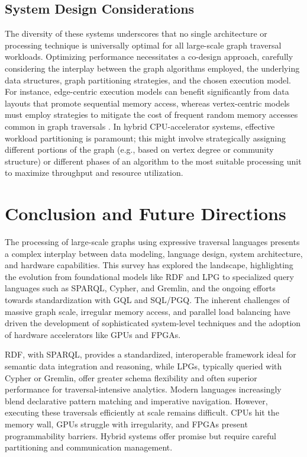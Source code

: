 \documentclass[sigconf,natbib=false]{acmart}
\begin{document}
\subsection*{System Design Considerations}

The diversity of these systems underscores that no single architecture or processing technique is universally optimal for all large-scale graph traversal workloads.
Optimizing performance necessitates a co-design approach, carefully considering the interplay between the graph algorithms employed, the underlying data structures, graph partitioning strategies, and the chosen execution model.
For instance, edge-centric execution models can benefit significantly from data layouts that promote sequential memory access, whereas vertex-centric models must employ strategies to mitigate the cost of frequent random memory accesses common in graph traversals \cite{liu2020LargescaleGraphProcessing}.
In hybrid CPU-accelerator systems, effective workload partitioning is paramount; this might involve strategically assigning different portions of the graph (e.g., based on vertex degree or community structure) or different phases of an algorithm to the most suitable processing unit to maximize throughput and resource utilization.

\section{Conclusion and Future Directions}
The processing of large-scale graphs using expressive traversal languages presents a complex interplay between data modeling, language design, system architecture, and hardware capabilities.
This survey has explored the landscape, highlighting the evolution from foundational models like RDF and LPG to specialized query languages such as SPARQL, Cypher, and Gremlin, and the ongoing efforts towards standardization with GQL and SQL/PGQ.
The inherent challenges of massive graph scale, irregular memory access, and parallel load balancing have driven the development of sophisticated system-level techniques and the adoption of hardware accelerators like GPUs and FPGAs.

RDF, with SPARQL, provides a standardized, interoperable framework ideal for semantic data integration and reasoning, while LPGs, typically queried with Cypher or Gremlin, offer greater schema flexibility and often superior performance for traversal-intensive analytics.
Modern languages increasingly blend declarative pattern matching and imperative navigation.
However, executing these traversals efficiently at scale remains difficult.
CPUs hit the memory wall, GPUs struggle with irregularity, and FPGAs present programmability barriers.
Hybrid systems offer promise but require careful partitioning and communication management.
\end{document}
